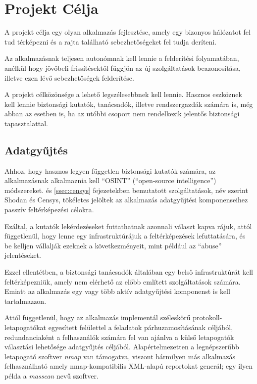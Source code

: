 \newpage
\section*{Projekt Célja}

	A projekt célja egy olyan alkalmazás fejlesztése, amely egy bizonyos hálózatot fel tud térképezni és a rajta található sebezhetőségeket fel tudja deríteni.
	
	Az alkalmazásnak teljesen autonómnak kell lennie a felderítési folyamatában, anélkül hogy jövőbeli frissítésektől függjön az új szolgáltatások beazonosítása, illetve ezen lévő sebezhetőségek felderítése.

	A projekt célközönsége a lehető legszélesebbnek kell lennie. Hasznos eszköznek kell lennie biztonsági kutatók, tanácsadók, illetve rendszergazdák számára is, még abban az esetben is, ha az utóbbi csoport nem rendelkezik jelentős biztonsági tapasztalattal.

\subsection*{Adatgyűjtés}

	Ahhoz, hogy hasznos legyen független biztonsági kutatók számára, az alkalmazásnak alkalmaznia kell ``OSINT'' (``open-source intelligence'') módszereket. \Az{\ref{ssec:shodan}} és \ref{ssec:censys} fejezetekben bemutatott szolgáltatások, név szerint Shodan\cite{shodan16} és Censys\cite{censys15}, tökéletes jelöltek az alkalmazás adatgyűjtési komponenseihez passzív feltérképezési célokra.
	
	Ezáltal, a kutatók lekérdezéseket futtathatnak azonnali választ kapva rájuk, attól függetlenül, hogy lenne egy infrastruktúrájuk a feltérképezések lefuttatására, és be kelljen vállalják ezeknek a következményeit, mint például az ``abuse'' jelentéseket.
	
	Ezzel ellentétben, a biztonsági tanácsadók általában egy belső infrastruktúrát kell feltérképezniük, amely nem elérhető az előbb említett szolgáltatások számára. Emiatt az alkalmazás egy vagy több aktív adatgyűjtési komponenst is kell tartalmazzon.
	
	Attól függetlenül, hogy az alkalmazás implementál széleskörű protokoll-letapogatókat egyesített felülettel a feladatok párhuzamosításának céljából, redundanciaként a felhasználók számára fel van ajánlva a külső letapogatók választási lehetősége adatgyűjtés céljából. Alapértelmezetten a legnépszerűbb letapogató szoftver \textit{nmap} van támogatva, viszont bármilyen más alkalmazás felhasználható amely nmap-kompatibilis XML-alapú reportokat generál; egy ilyen példa a \textit{masscan} nevű szoftver.

